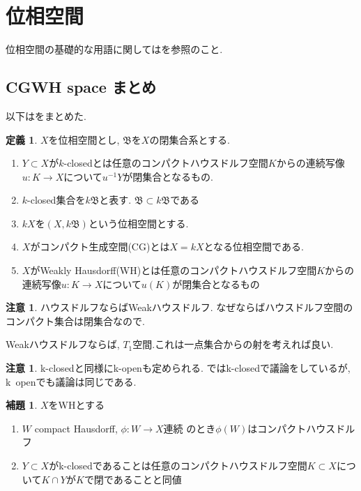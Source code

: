 \documentclass[dvipdfmx,a4paper,11pt]{article}
\theoremstyle{definition}
\newtheorem{lem}[thm]{補題}
\newtheorem{dfn}[thm]{定義}
\newtheorem{rem}[thm]{注意}
\begin{document}
\newpage
\section{位相空間}
位相空間の基礎的な用語に関しては\cite{Iwa22}を参照のこと.

\subsection{CGWH space まとめ}
以下は\cite{Str}をまとめた. 

 \begin{tcolorbox}
 [colback = white, colframe = green!35!black, fonttitle = \bfseries,breakable = true]
\begin{dfn}\cite[Definition 1.1 ,1.2]{Str}
$X$を位相空間とし, $\mathfrak{B}$を$X$の閉集合系とする. 
\begin{enumerate}
\item $Y \subset X$が$k$-closedとは任意のコンパクトハウスドルフ空間$K$からの連続写像$u : K \to X$について$u^{-1}Y$が閉集合となるもの. 
\item $k$-closed集合を$k\mathfrak{B}$と表す. $\mathfrak{B} \subset k \mathfrak{B}$である
\item $kX$を$(X, k\mathfrak{B})$という位相空間とする. 
\item $X$がコンパクト生成空間(CG)とは$X = kX$となる位相空間である.
\item $X$がWeakly Hausdorff(WH)とは任意のコンパクトハウスドルフ空間$K$からの連続写像$u : K \to X$について$u(K)$が閉集合となるもの
\end{enumerate}
\end{dfn}
\end{tcolorbox}

\begin{rem}
ハウスドルフならばWeakハウスドルフ.
なぜならばハウスドルフ空間のコンパクト集合は閉集合なので.

Weakハウスドルフならば, $T_1$空間.これは一点集合からの射を考えれば良い.
\end{rem}

\begin{rem}
k-closedと同様にk-openも定められる. 
\cite{Str}ではk-closedで議論をしているが, k~openでも議論は同じである.
\end{rem}


 \begin{tcolorbox}
 [colback = white, colframe = green!35!black, fonttitle = \bfseries,breakable = true]
\begin{lem}\cite[Lemma 1.3]{Str}
\label{lem-weakhaus}
$X$をWHとする
\begin{enumerate}
\item $W$ compact Hausdorff, $\phi : W \to X$連続
のとき$\phi(W)$はコンパクトハウスドルフ
\item $Y \subset X$がk-closedであることは任意のコンパクトハウスドルフ空間$K \subset X$について$K \cap Y$が$K$で閉であることと同値
\end{enumerate}
\end{lem}
\end{tcolorbox}
\end{document}
